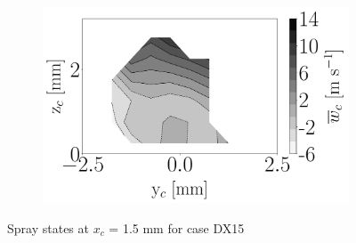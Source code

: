 \begin{figure}[h!]
\begin{subfigure}[b]{0.3\textwidth}
   \includegraphics[scale=\scaleSLIBIMER]{./part3_applications/figures_ch8_resolved/injectors_SLI/dx15_xD05p00_uz_mean_map}
\end{subfigure}
\caption{Spray states at $x_c$ = 1.5 mm for case DX15}
\label{fig:injectors_sli_BIMER_DX15_xD05}
\end{figure}



